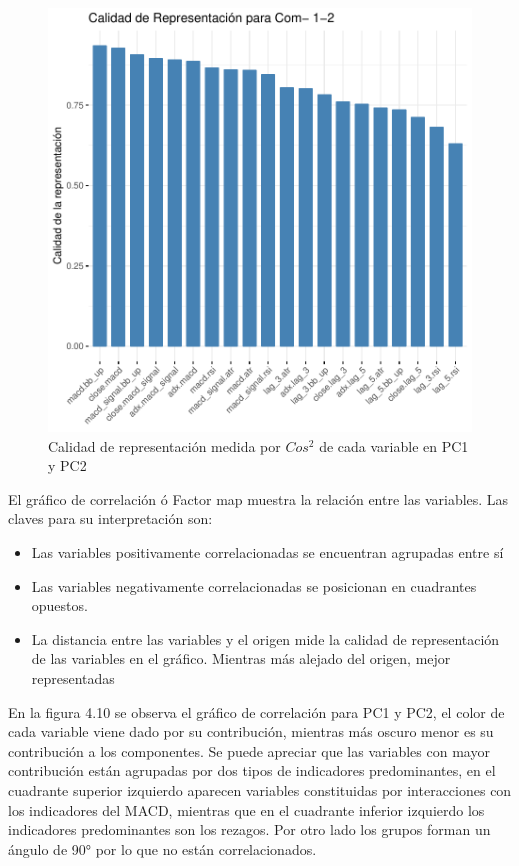 \documentclass[a4paper,12pt]{Latex/Classes/PhDthesisPSnPDF}
\begin{document}
\begin{figure}[H]
\centering
\includegraphics{main-015}
\caption{Calidad de representación medida por $Cos^2$ de cada variable en PC1 y PC2}
\end{figure}

El gráfico de correlación ó Factor map muestra la relación entre las variables. Las claves para su interpretación son:

\begin{itemize}
\item Las variables positivamente correlacionadas se encuentran agrupadas entre sí
\item Las variables negativamente correlacionadas se posicionan en cuadrantes opuestos.
\item La distancia entre las variables y el origen mide la calidad de representación de las variables en el gráfico. Mientras más alejado del origen, mejor representadas 
\end{itemize}

En la figura 4.10 se observa el gráfico de correlación para PC1 y PC2, el color de cada variable viene dado por su contribución, mientras más oscuro menor es su contribución a los componentes. Se puede apreciar que las variables con mayor contribución están agrupadas por dos tipos de indicadores predominantes, en el cuadrante superior izquierdo aparecen variables constituidas por interacciones con los indicadores del MACD, mientras que en el cuadrante inferior izquierdo los indicadores predominantes son los rezagos. Por otro lado los grupos forman un ángulo de 90° por lo que no están correlacionados.
\end{document}
